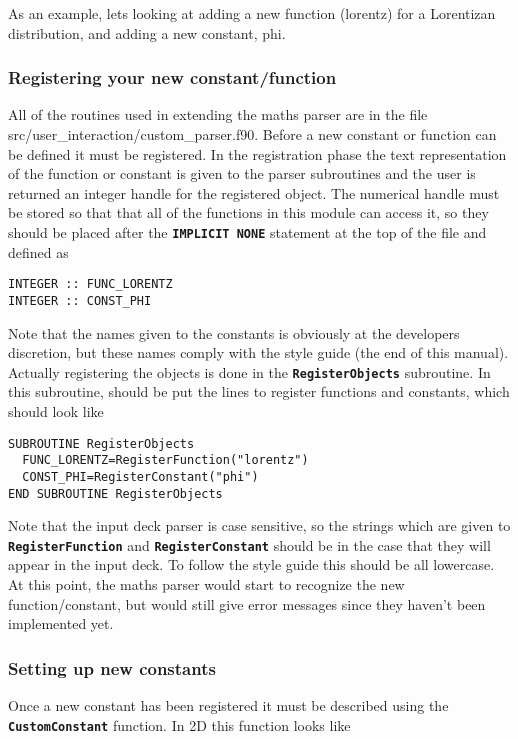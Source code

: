 \documentclass[12pt,a4paper]{article}
\newcommand{\simpleboxverbatim}{\begin{Verbatim}[obeytabs=true,frame=single,
  framerule=0.5mm,rulecolor=\color{warwickmid},formatcom=\color{black}]}
\newcommand{\inlinecode}[1]{{\color{warwickred} \bf\texttt{#1}}}
\newcommand{\EPOCH}{{\color{warwickdark}\fontfamily{phv}\selectfont{EPOCH}}}
\begin{document}
As an example, lets looking at adding a new function (lorentz) for a
Lorentizan distribution, and adding a new constant, phi.

\subsubsection{Registering your new constant/function}
All of the routines used in extending the maths parser are in the file
src/user\_interaction/custom\_parser.f90.  Before a new constant or function
can be defined it must be registered. In the registration phase the text
representation of the function or constant is given to the parser subroutines
and the user is returned an integer handle for the registered object. The
numerical handle must be stored so that that all of the functions in this
module can access it, so they should be placed after the \inlinecode{IMPLICIT
NONE} statement at the top of the file and defined as

\simpleboxverbatim
INTEGER :: FUNC_LORENTZ
INTEGER :: CONST_PHI
\end{Verbatim}

Note that the names given to the constants is obviously at the developers
discretion, but these names comply with the {\EPOCH} style guide (the end of
this manual). Actually registering the objects is done in the
\inlinecode{RegisterObjects} subroutine. In this subroutine, should be put the
lines to register functions and constants, which should look like

\simpleboxverbatim
SUBROUTINE RegisterObjects
  FUNC_LORENTZ=RegisterFunction("lorentz")
  CONST_PHI=RegisterConstant("phi")
END SUBROUTINE RegisterObjects
\end{Verbatim}

Note that the input deck parser is case sensitive, so the strings which are
given to \inlinecode{RegisterFunction} and \inlinecode{RegisterConstant}
should be in the case that they will appear in the input deck. To follow the
{\EPOCH} style guide this should be all lowercase. At this point, the maths
parser would start to recognize the new function/constant, but would still
give error messages since they haven't been implemented yet.

\subsubsection{Setting up new constants}

Once a new constant has been registered it must be described using the
\inlinecode{CustomConstant} function. In 2D this function looks like
\end{document}
